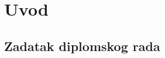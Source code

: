 \newpage

\setcounter{page}{1}
\setcounter{figure}{0}
\section{Uvod}%
\label{sec:Uvod}

\newpage
\subsection{Zadatak diplomskog rada} %
\label{sub:Zadatak diplomskog rada}

